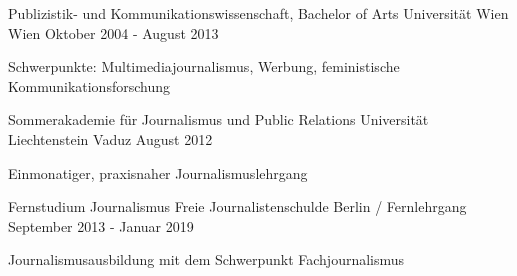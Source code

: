 

\begin{cventries}

  \cventry
    {Publizistik- und Kommunikationswissenschaft, Bachelor of Arts} %
    {Universität Wien} %
    {Wien} %
    {Oktober 2004 - August 2013} %
    {
      \begin{cvitems} %
        \item {Schwerpunkte: Multimediajournalismus, Werbung, feministische Kommunikationsforschung}
      \end{cvitems}
    }

    \cventry
    {Sommerakademie für Journalismus und Public Relations} %
    {Universität Liechtenstein} %
    {Vaduz} %
    {August 2012} %
    {
      \begin{cvitems} %
        \item {Einmonatiger, praxisnaher Journalismuslehrgang}
      \end{cvitems}
    }

    \cventry
    {Fernstudium Journalismus} %
    {Freie Journalistenschulde} %
    {Berlin / Fernlehrgang} %
    {September 2013 - Januar 2019} %
    {
      \begin{cvitems} %
        \item {Journalismusausbildung mit dem Schwerpunkt Fachjournalismus}
      \end{cvitems}
    }

  


\end{cventries}

